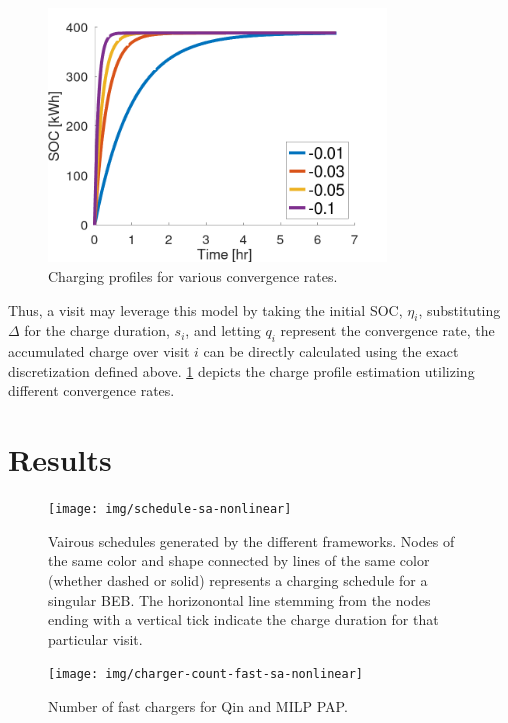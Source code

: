 \documentclass[ee,thesis]{usuthesis}
\begin{document}
\begin{figure}[htpb]
    \centering \includegraphics[width=0.8\textwidth]{img/nonlinear-bat.png}
    \caption{Charging profiles for various convergence rates.}
    \label{fig:convergence-rates}
\end{figure}

Thus, a visit may leverage this model by taking the initial SOC, \(\eta_i\), substituting \(\Delta\) for the charge duration, \(s_i\),
and letting \(q_i\) represent the convergence rate, the accumulated charge over visit \(i\) can be directly calculated using
the exact discretization defined above. \ref{fig:convergence-rates} depicts the charge profile estimation utilizing
different convergence rates.

\section{Results}
\label{sec:nonlinear-results}
\begin{figure}[h]
  \centering
  \texttt{[image: img/schedule-sa-nonlinear]}
  \label{subfig:schedule-quick-sa}
  \caption{Vairous schedules generated by the different frameworks. Nodes of the same color and shape connected by lines of the same color (whether dashed or solid) represents a charging schedule for a singular BEB. The horizonontal line stemming from the nodes ending with a vertical tick indicate the charge duration for that particular visit.}
  \label{fig:schedule}
\end{figure}

\begin{figure}[h]
  \centering
  \texttt{[image: img/charger-count-fast-sa-nonlinear]}
  \caption{Number of fast chargers for Qin and MILP PAP.}
  \label{subfig:fast-charger-usage-milp-qinn}
\end{figure}
\end{document}
